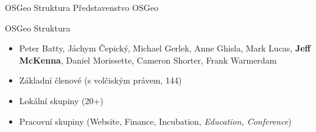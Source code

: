\documentclass{beamer}
\begin{document}
\begin{frame}{OSGeo Struktura}
    Představenstvo OSGeo
    \begin{center}
    \end{center}

\end{frame}
\begin{frame}{OSGeo Struktura}
\begin{itemize}
    \item Peter Batty, Jáchym Čepický, Michael Gerlek, Anne Ghisla, Mark Lucas,
        {\bf Jeff McKenna}, Daniel Morissette, Cameron Shorter, Frank Warmerdam
    \item Základní členové (s volčiským právem, 144)
            \pause
    \item Lokální skupiny  (20+)
            \pause
    \item Pracovní skupiny (Website, Finance, Incubation, {\em Education, Conference})
\end{itemize}
\end{frame}
\end{document}
